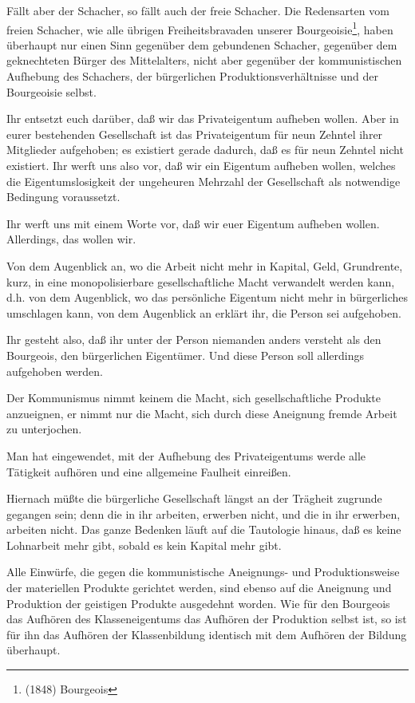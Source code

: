 \documentclass[letterpaper]{article}
\begin{document}
Fällt aber der Schacher, so fällt auch der freie Schacher. Die Redensarten vom freien Schacher, wie alle übrigen Freiheitsbravaden unserer Bourgeoisie\footnote{(1848) Bourgeois}, haben überhaupt nur einen Sinn gegenüber dem gebundenen Schacher, gegenüber dem geknechteten Bürger des Mittelalters, nicht aber gegenüber der kommunistischen Aufhebung des Schachers, der bürgerlichen Produktionsverhältnisse und der Bourgeoisie selbst.

Ihr entsetzt euch darüber, daß wir das Privateigentum aufheben wollen. Aber in eurer bestehenden Gesellschaft ist das Privateigentum für neun Zehntel ihrer Mitglieder aufgehoben; es existiert gerade dadurch, daß es für neun Zehntel nicht existiert. Ihr werft uns also vor, daß wir ein Eigentum aufheben wollen, welches die Eigentumslosigkeit der ungeheuren Mehrzahl der Gesellschaft als notwendige Bedingung voraussetzt.

Ihr werft uns mit einem Worte vor, daß wir euer Eigentum aufheben wollen. Allerdings, das wollen wir. 

Von dem Augenblick an, wo die Arbeit nicht mehr in Kapital, Geld, Grundrente, kurz, in eine monopolisierbare gesellschaftliche Macht verwandelt werden kann, d.h. von dem Augenblick, wo das persönliche Eigentum nicht mehr in bürgerliches umschlagen kann, von dem Augenblick an erklärt ihr, die Person sei aufgehoben.

Ihr gesteht also, daß ihr unter der Person niemanden anders versteht als den Bourgeois, den bürgerlichen Eigentümer. Und diese Person soll allerdings aufgehoben werden.

Der Kommunismus nimmt keinem die Macht, sich gesellschaftliche Produkte anzueignen, er nimmt nur die Macht, sich durch diese Aneignung fremde Arbeit zu unterjochen.

Man hat eingewendet, mit der Aufhebung des Privateigentums werde alle Tätigkeit aufhören und eine allgemeine Faulheit einreißen.

Hiernach müßte die bürgerliche Gesellschaft längst an der Trägheit zugrunde gegangen sein; denn die in ihr arbeiten, erwerben nicht, und die in ihr erwerben, arbeiten nicht. Das ganze Bedenken läuft auf die Tautologie hinaus, daß es keine Lohnarbeit mehr gibt, sobald es kein Kapital mehr gibt.

Alle Einwürfe, die gegen die kommunistische Aneignungs- und Produktionsweise der materiellen Produkte gerichtet werden, sind ebenso auf die Aneignung und Produktion der geistigen Produkte ausgedehnt worden. Wie für den Bourgeois das Aufhören des Klasseneigentums das Aufhören der Produktion selbst ist, so ist für ihn das Aufhören der Klassenbildung identisch mit dem Aufhören der Bildung überhaupt.
\end{document}
